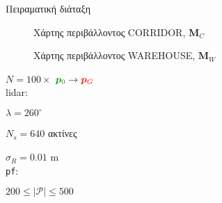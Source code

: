 \begin{frame}{Πειραματική διάταξη}


\begin{minipage}{\linewidth}
  \begin{minipage}{0.33\linewidth}
    \begin{figure}
      
      \vspace{0.15cm}
      \caption{\scriptsize Χάρτης περιβάλλοντος CORRIDOR, $\bm{M}_C$}
    \end{figure}
  \end{minipage}
  \begin{minipage}{0.33\linewidth}
    \begin{figure}
      
      \vspace{0.15cm}
      \caption{\scriptsize Χάρτης περιβάλλοντος WAREHOUSE, $\bm{M}_W$}
    \end{figure}
  \end{minipage}
  \begin{minipage}{0.3\linewidth}
    $N = 100 \times $ $\textcolor{g}{\bm{p}_0} \rightarrow \textcolor{r}{\bm{p}_G}$\\

    lidar:

    $\lambda = 260^\circ$

    $N_s = 640$ ακτίνες

    $\sigma_R = 0.01$ m \\

    \texttt{pf}:

    $200 \leq |\mathcal{P}| \leq 500$

  \end{minipage}

\end{minipage}

\end{frame}
